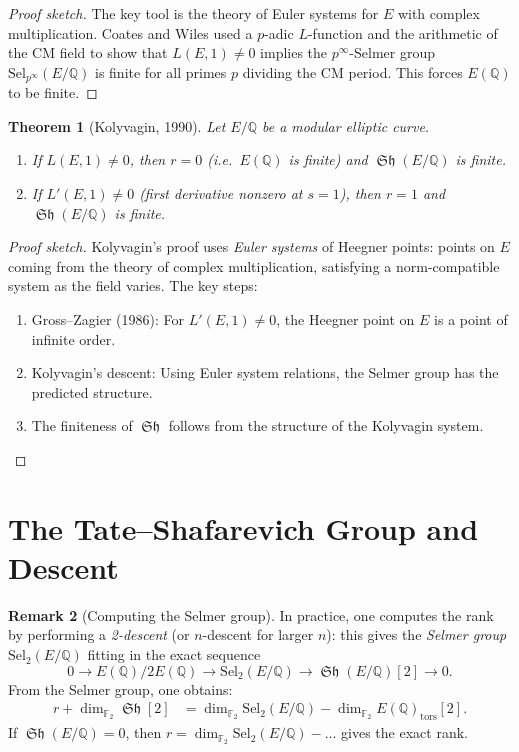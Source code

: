 \documentclass[12pt,a4paper]{amsart}
\newtheorem{theorem}{Theorem}[section]
\theoremstyle{definition}
\newtheorem{remark}[theorem]{Remark}
\newcommand{\Q}{\mathbb{Q}}
\DeclareMathOperator{\Sha}{\mathfrak{Sh}}
\begin{document}
\begin{proof}[Proof sketch]
The key tool is the theory of Euler systems for $E$ with complex multiplication.
Coates and Wiles \cite{CoatesWiles1977} used a $p$-adic $L$-function and
the arithmetic of the CM field to show that $L(E,1) \ne 0$ implies the
$p^\infty$-Selmer group $\mathrm{Sel}_{p^\infty}(E/\Q)$ is finite for
all primes $p$ dividing the CM period.  This forces $E(\Q)$ to be finite.
\end{proof}

\begin{theorem}[Kolyvagin, 1990]
\label{thm:kolyvagin}
Let $E/\Q$ be a modular elliptic curve.
\begin{enumerate}
  \item[\textup{(i)}] If $L(E,1) \ne 0$, then $r = 0$ (i.e.\ $E(\Q)$ is finite)
    and $\Sha(E/\Q)$ is finite.
  \item[\textup{(ii)}] If $L'(E,1) \ne 0$ (first derivative nonzero at $s=1$),
    then $r = 1$ and $\Sha(E/\Q)$ is finite.
\end{enumerate}
\end{theorem}

\begin{proof}[Proof sketch]
Kolyvagin's \cite{Kolyvagin1990} proof uses \emph{Euler systems} of Heegner points:
points on $E$ coming from the theory of complex multiplication,
satisfying a norm-compatible system as the field varies.
The key steps:
\begin{enumerate}
  \item Gross--Zagier (1986): For $L'(E,1) \ne 0$, the Heegner point on $E$
    is a point of infinite order.
  \item Kolyvagin's descent: Using Euler system relations, the Selmer group
    has the predicted structure.
  \item The finiteness of $\Sha$ follows from the structure of the
    Kolyvagin system.
\end{enumerate}
\end{proof}

\section{The Tate--Shafarevich Group and Descent}

\begin{remark}[Computing the Selmer group]
In practice, one computes the rank by performing a \emph{2-descent}
(or $n$-descent for larger $n$): this gives the \emph{Selmer group}
$\mathrm{Sel}_2(E/\Q)$ fitting in the exact sequence
\[
  0 \to E(\Q)/2E(\Q) \to \mathrm{Sel}_2(E/\Q) \to \Sha(E/\Q)[2] \to 0.
\]
From the Selmer group, one obtains:
\begin{align*}
  r + \dim_{\mathbb{F}_2} \Sha[2]
  &= \dim_{\mathbb{F}_2} \mathrm{Sel}_2(E/\Q) - \dim_{\mathbb{F}_2}E(\Q)_{\mathrm{tors}}[2].
\end{align*}
If $\Sha(E/\Q) = 0$, then $r = \dim_{\mathbb{F}_2} \mathrm{Sel}_2(E/\Q) - \ldots$
gives the exact rank.
\end{remark}
\end{document}
